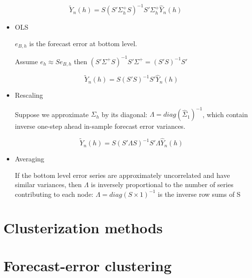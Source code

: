 \documentclass[c, dvipsnames]{beamer}  %
\begin{document}
\begin{frame}[shrink=5]
\frametitle{\insertsection} 
\framesubtitle{\insertsubsection}


\[ \tilde{Y}_n ( h )
= 
 S ( S' \Sigma^{+}_h S )^{-1}  S'  \Sigma^{+}_h  \hat{Y}_n ( h )
\]


\begin{itemize}
	\item OLS
	
 	 $ e_{B , h} $ is the forecast
	error at bottom level.
	
	Assume $ e_h \approx S e_{B , h} $ 	
	then $ ( S' \Sigma^{+}  S )^{-1} S'  \Sigma^{+} = ( S'S )^{ - 1} S'  $
	
	
\[  \tilde{Y}_n ( h )
 =  S ( S'  S )^{-1}  S'   \hat{Y}_n ( h )
 \]	
	
	
	\item Rescaling
	
	Suppose we approximate $ \Sigma_h $ by its diagonal: 
$ \Lambda = diag(\hat{\Sigma}_1)^{-1}
 $,  which	
 contain inverse
	one-step ahead in-sample forecast error
	variances.
	
	\[ \tilde{Y}_n ( h )
	=  S ( S'  \Lambda S )^{-1}  S'   \Lambda  \hat{Y}_n ( h )
	\]
	
	\item Averaging
	
	If the bottom level error series are
	approximately uncorrelated and have similar
	variances, then $ \Lambda $ is inversely proportional to
	the number of series contributing to each
	node: 
	$ \Lambda = diag( S \times 1 )^{- 1}
 $ is  the inverse row sums of S
 
\end{itemize}




\end{frame}






\section{Clusterization methods}

\section{Forecast-error clustering}
\end{document}
